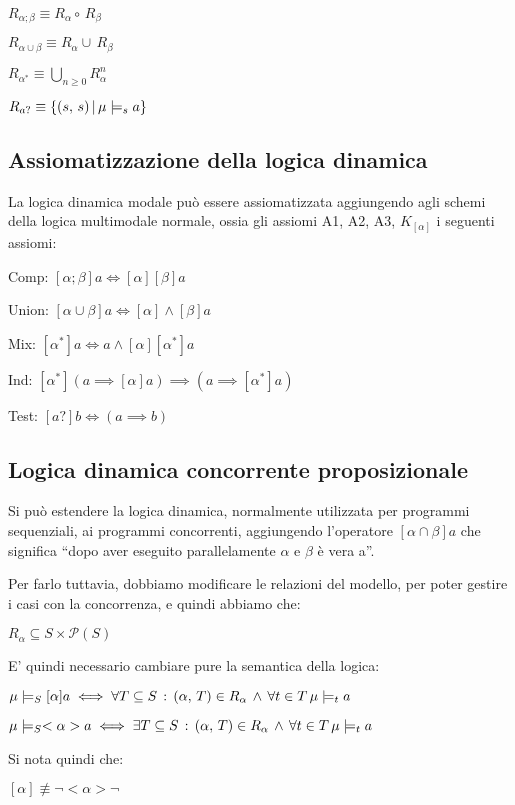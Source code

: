 $R_{\alpha;\beta}\equiv R_{\alpha}\circ\, R_{\beta}$

$R_{\alpha\cup\beta}\equiv R_{\alpha}\cup\, R_{\beta}$

$R_{\alpha^{*}}\equiv\underset{n\geq0}{\bigcup}R_{\alpha}^{n}$

$R_{a?}\equiv\{(s,\, s)\,|\,\mu\models_{s}a\}$


\subsection{Assiomatizzazione della logica dinamica}

La logica dinamica modale può essere assiomatizzata aggiungendo agli
schemi della logica multimodale normale, ossia gli assiomi A1, A2,
A3, $K_{[\alpha]}$ i seguenti assiomi:

Comp: $[\alpha;\beta]a\iff[\alpha][\beta]a$

Union: $[\alpha\cup\beta]a\iff[\alpha]\wedge[\beta]a$ 

Mix: $[\alpha^{*}]a\iff a\wedge[\alpha][\alpha^{*}]a$

Ind: $[\alpha^{*}](a\implies[\alpha]a)\implies(a\implies[\alpha^{*}]a)$

Test: $[a?]b\iff(a\implies b)$


\subsection{Logica dinamica concorrente proposizionale}

Si può estendere la logica dinamica, normalmente utilizzata per programmi
sequenziali, ai programmi concorrenti, aggiungendo l'operatore $[\alpha\cap\beta]a$
che significa ``dopo aver eseguito parallelamente $\alpha$ e $\beta$
è vera a''.

Per farlo tuttavia, dobbiamo modificare le relazioni del modello,
per poter gestire i casi con la concorrenza, e quindi abbiamo che:

$R_{\alpha}\subseteq S\times\mathcal{P}(S)$

E' quindi necessario cambiare pure la semantica della logica:

$\mu\models_{S}[\alpha]a\iff\forall T\subseteq S\,:\,(\alpha,\, T)\in R_{\alpha}\,\wedge\,\forall t\in T\,\mu\models_{t}a$

$\mu\models_{S}<\alpha>a\iff\exists T\subseteq S\,:\,(\alpha,\, T)\in R_{\alpha}\,\wedge\,\forall t\in T\,\mu\models_{t}a$

Si nota quindi che:

$[\alpha]\not\equiv\neg<\alpha>\neg$

